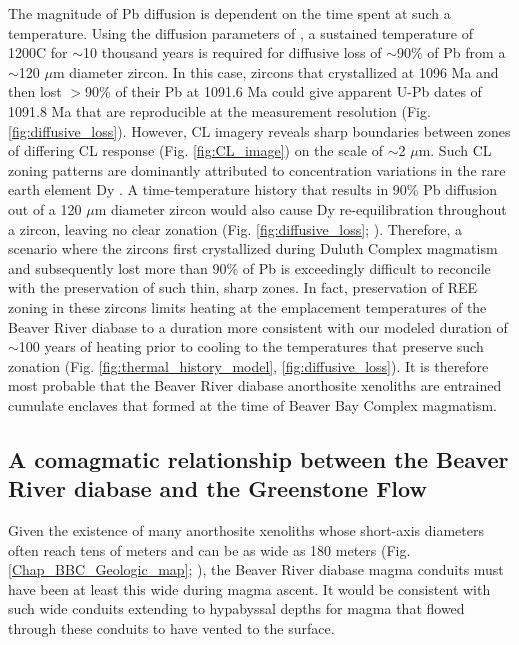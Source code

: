 The magnitude of Pb diffusion is dependent on the time spent at such a temperature. Using the diffusion parameters of \cite{Cherniak2001a}, a sustained temperature of 1200\textdegree C for $\sim$10 thousand years is required for diffusive loss of $\sim$90\% of Pb from a $\sim$120 $\mu$m diameter zircon. In this case, zircons that crystallized at 1096 Ma and then lost $>$90\% of their Pb at 1091.6 Ma could give apparent U-Pb dates of 1091.8 Ma that are reproducible at the measurement resolution (Fig. \ref{fig:diffusive_loss}). However, CL imagery reveals sharp boundaries between zones of differing CL response (Fig. \ref{fig:CL_image}) on the scale of $\sim$2 $\mu$m. Such CL zoning patterns are dominantly attributed to concentration variations in the rare earth element Dy \citep{Remond1992a}. A time-temperature history that results in 90\% Pb diffusion out of a 120 $\mu$m diameter zircon would also cause Dy re-equilibration throughout a zircon, leaving no clear zonation (Fig. \ref{fig:diffusive_loss}; \citealp{Cherniak1997a}). Therefore, a scenario where the zircons first crystallized during Duluth Complex magmatism and subsequently lost more than 90\% of Pb is exceedingly difficult to reconcile with the preservation of such thin, sharp zones. In fact, preservation of REE zoning in these zircons limits heating at the emplacement temperatures of the Beaver River diabase to a duration more consistent with our modeled duration of $\sim$100 years of heating prior to cooling to the temperatures that preserve such zonation (Fig. \ref{fig:thermal_history_model}, \ref{fig:diffusive_loss}). It is therefore most probable that the Beaver River diabase anorthosite xenoliths are entrained cumulate enclaves that formed at the time of Beaver Bay Complex magmatism. 

\subsection{A comagmatic relationship between the Beaver River diabase and the Greenstone Flow}

Given the existence of many anorthosite xenoliths whose short-axis diameters often reach tens of meters and can be as wide as 180 meters (Fig. \ref{Chap_BBC_Geologic_map}; \citealp{Boerboom2004a, Boerboom2006b}), the Beaver River diabase magma conduits must have been at least this wide during magma ascent. It would be consistent with such wide conduits extending to hypabyssal depths for magma that flowed through these conduits to have vented to the surface.
 

